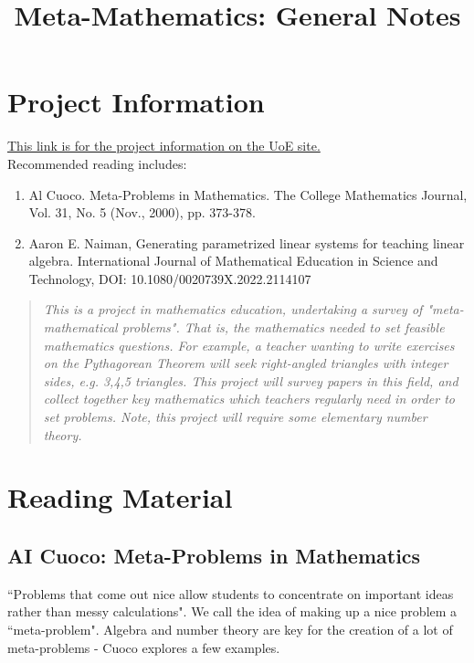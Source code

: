 \documentclass[12pt]{article}
\title{Meta-Mathematics: General Notes}
\author{}
\date{}
\begin{document}
\maketitle

\tableofcontents
\pagebreak

\section{Project Information}
\href{https://webapps.maths.ed.ac.uk/student_choices/project_info.php?id=UG1429}{This link is for the project information on the UoE site.}\\
Recommended reading includes:
\begin{enumerate}
    \item Al Cuoco. Meta-Problems in Mathematics. The College Mathematics Journal, Vol. 31, No. 5 (Nov., 2000), pp. 373-378.
    \item Aaron E. Naiman, Generating parametrized linear systems for teaching linear algebra. International Journal of Mathematical Education in Science and Technology, DOI: 10.1080/0020739X.2022.2114107
\end{enumerate}

\begin{quote}
    \textit{This is a project in mathematics education, undertaking a survey of "meta-mathematical problems". That is, the mathematics needed to set feasible mathematics questions. For example, a teacher wanting to write exercises on the Pythagorean Theorem will seek right-angled triangles with integer sides, e.g. 3,4,5 triangles. This project will survey papers in this field, and collect together key mathematics which teachers regularly need in order to set problems. Note, this project will require some elementary number theory.}
\end{quote}

\pagebreak 

\section{Reading Material}

\subsection{AI Cuoco: Meta-Problems in Mathematics}
``Problems that come out nice allow students to concentrate on important ideas rather than messy calculations". We call the idea of making up a nice problem a ``meta-problem". Algebra and number theory are key for the creation of a lot of meta-problems - Cuoco explores a few examples.
\end{document}
